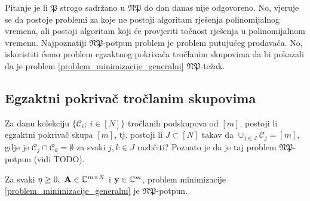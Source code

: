 \documentclass[a4paper,twoside,12pt]{memoir} %
\newcommand{\vect}[1]{\mathbf{#1}}
\renewcommand{\vec}{\vect}
\begin{document}
Pitanje je li $\mathfrak{P}$ strogo sadr\v{z}ano u  $\mathfrak{NP}$ do dan danas nije odgovoreno. No, vjeruje se da postoje problemi za koje ne postoji algoritam rje\v{s}enja polinomijalnog vremena, ali postoji algoritam koji \'ce provjeriti to\v{c}nost rje\v{s}enja u polinomijalnom vremenu.
Najpoznatiji $\mathfrak{NP}$-potpun problem je problem putuju\'ceg prodava\v{c}a. No, iskoristiti \'cemo  problem egzaktnog pokriva\v{c}a tro\v{c}lanim skupovima da bi pokazali da je problem \eqref{problem_minimizacije_generalni} $\mathfrak{NP}$-te\v{z}ak.

\subsection[Egzaktni pokriva\v{c} tro\v{c}lanim skupovima][Egzaktni pokriva\v{c} tro\v{c}lanim skupovima]{Egzaktni pokriva\v{c} tro\v{c}lanim skupovima}
Za danu kolekciju $\{\mathcal{C}_i;\ i \in [N]\}$ tro\v{c}lanih podskupova od $[m]$, postoji li egzaktni pokriva\v{c} skupa $[m]$, tj. postoji li $J \subset [N]$ takav da $\cup_{j \in J}\mathcal{C}_j=[m]$, gdje je $\mathcal{C}_j \cap \mathcal{C}_k = \emptyset$ za svaki $j,k \in J$ razli\v{c}iti? Poznato je da je taj problem $\mathfrak{NP}$-potpun (vidi TODO).
\begin{thm}
    Za svaki $\eta \geq 0,\ \vec A \in \C^{m \times N}$ i $\vec y \in \C^m$, problem minimizacije \eqref{problem_minimizacije_generalni} je $\mathfrak{NP}$-potpun.
\end{thm}
\end{document}

